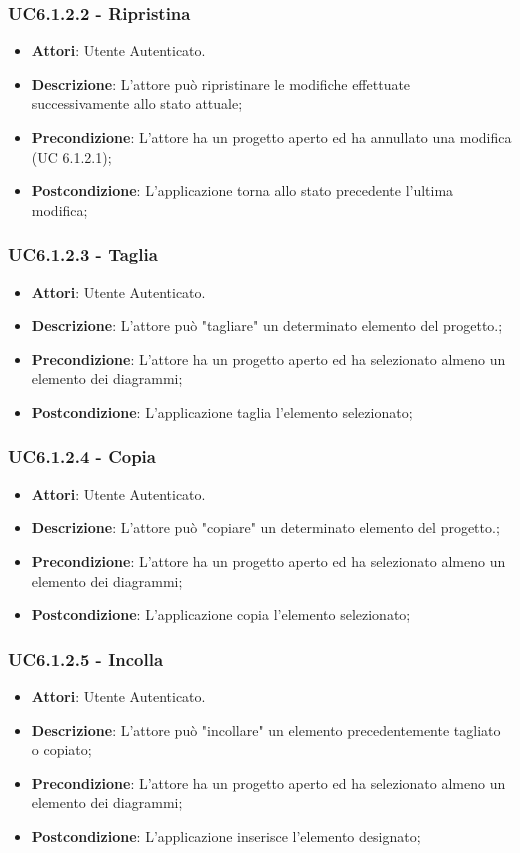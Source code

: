 \subsubsection{UC6.1.2.2 - Ripristina} 
\label{sssec:UC6.1.2.2} 
\begin{itemize} 
\item \textbf{Attori}: Utente Autenticato.
\item \textbf{Descrizione}: L’attore può ripristinare le modifiche effettuate successivamente allo stato attuale;
\item \textbf{Precondizione}: L’attore ha un progetto aperto ed ha annullato una modifica (UC 6.1.2.1);
\item \textbf{Postcondizione}: L’applicazione torna allo stato precedente l’ultima modifica;
\end{itemize} 
\subsubsection{UC6.1.2.3 - Taglia} 
\label{sssec:UC6.1.2.3} 
\begin{itemize} 
\item \textbf{Attori}: Utente Autenticato.
\item \textbf{Descrizione}: L’attore può "tagliare" un determinato elemento del progetto.;
\item \textbf{Precondizione}: L’attore ha un progetto aperto ed ha selezionato almeno un elemento dei diagrammi;
\item \textbf{Postcondizione}: L’applicazione taglia l’elemento selezionato;
\end{itemize} 
\subsubsection{UC6.1.2.4 - Copia} 
\label{sssec:UC6.1.2.4} 
\begin{itemize} 
\item \textbf{Attori}: Utente Autenticato.
\item \textbf{Descrizione}: L’attore può "copiare" un determinato elemento del progetto.;
\item \textbf{Precondizione}: L’attore ha un progetto aperto ed ha selezionato almeno un elemento dei diagrammi;
\item \textbf{Postcondizione}: L’applicazione copia l’elemento selezionato;
\end{itemize} 
\subsubsection{UC6.1.2.5 - Incolla} 
\label{sssec:UC6.1.2.5} 
\begin{itemize} 
\item \textbf{Attori}: Utente Autenticato.
\item \textbf{Descrizione}: L’attore può "incollare" un elemento precedentemente tagliato o copiato;
\item \textbf{Precondizione}: L’attore ha un progetto aperto ed ha selezionato almeno un elemento dei diagrammi;
\item \textbf{Postcondizione}: L’applicazione inserisce l’elemento designato;
\end{itemize} 
